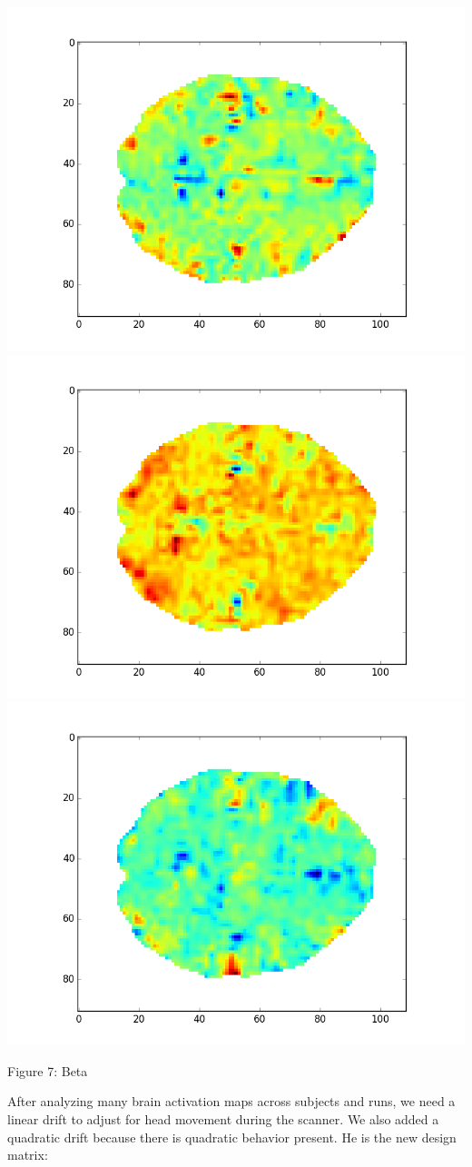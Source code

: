 \documentclass[12pt]{article}
\begin{document}
\begin{housevseverything}
    \centering
      \includegraphics[width=.5\textwidth]{betas_vols_face}
      \includegraphics[width=.5\textwidth]{betas_vols_house}
      \includegraphics[width=.5\textwidth]{betas_vols_scissors}
    \caption{Figure 7: Beta}
\end{housevseverything}



After analyzing many brain activation maps across subjects and runs, we need a linear drift to adjust for head movement during the scanner. We also added a quadratic drift because there is quadratic behavior present. He is the new design matrix:
\end{document}
